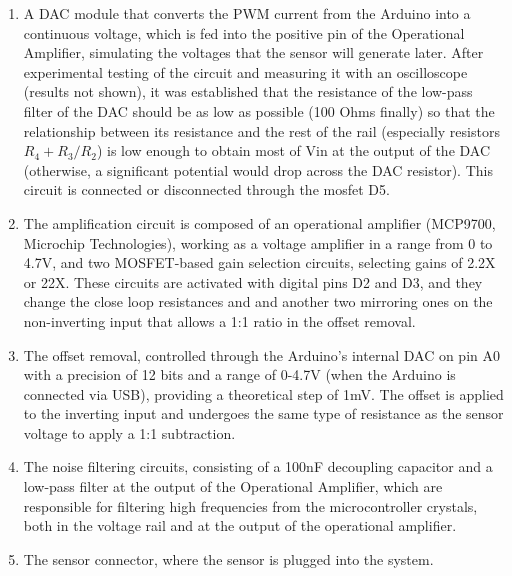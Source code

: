 \documentclass[conference]{IEEEtran}
\begin{document}
         \begin{enumerate}
            \item A DAC module that converts the PWM current from the Arduino into a continuous voltage, which is fed into the positive 
               pin of the Operational Amplifier, simulating the voltages that the sensor will generate later. After experimental testing of
               the circuit and measuring it with an oscilloscope (results not shown), it was established that the resistance of the low-pass
               filter of the DAC should be as low as possible (100 Ohms finally) so that the relationship between its resistance and the
               rest of the rail (especially resistors $R_4 + {R_3} / {R_2}$) is low enough to obtain most of Vin at the output of the
               DAC (otherwise, a significant potential would drop across the DAC resistor). This circuit is connected or disconnected
               through the mosfet D5.

            \item The amplification circuit is composed of an operational amplifier (MCP9700, Microchip Technologies), working as a voltage amplifier in a range from 0 to 4.7V, and two MOSFET-based
               gain selection circuits, selecting gains of 2.2X or 22X. These circuits are activated with digital pins D2 and D3, and they change the close loop resistances
               and and another two mirroring ones on the non-inverting input that allows a 1:1 ratio in the offset removal.

            \item The offset removal, controlled through the Arduino's internal DAC on pin A0 with a precision of 12 bits and a range of 0-4.7V
               (when the Arduino is connected via USB), providing a theoretical step of 1mV. The offset is applied to the inverting input and undergoes
               the same type of resistance as the sensor voltage to apply a 1:1 subtraction.

            \item The noise filtering circuits, consisting of a 100nF decoupling capacitor and a low-pass filter at the output of the Operational
               Amplifier, which are responsible for filtering high frequencies from the microcontroller crystals, both in the voltage rail and at
               the output of the operational amplifier.

            \item The sensor connector, where the sensor is plugged into the system.
         \end{enumerate}
\end{document}
